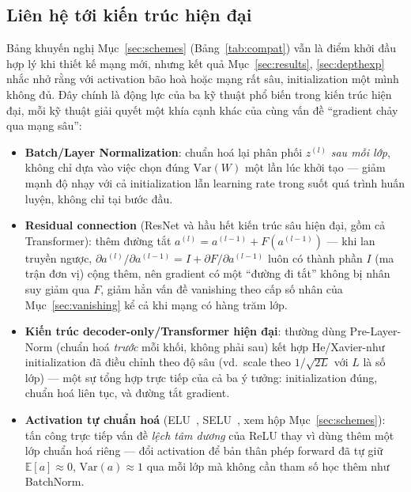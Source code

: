 \documentclass[12pt,a4paper]{article}
\begin{document}
\subsection{Liên hệ tới kiến trúc hiện đại}

Bảng khuyến nghị Mục~\ref{sec:schemes} (Bảng~\ref{tab:compat}) vẫn là
điểm khởi đầu hợp lý khi thiết kế mạng mới, nhưng kết quả
Mục~\ref{sec:results}, \ref{sec:depthexp} nhắc nhở rằng với activation
bão hoà hoặc mạng rất sâu, initialization một mình không đủ. Đây chính là
động lực của ba kỹ thuật phổ biến trong kiến trúc hiện đại, mỗi kỹ thuật
giải quyết một khía cạnh khác của cùng vấn đề ``gradient chảy qua mạng
sâu'':

\begin{itemize}
\item \textbf{Batch/Layer Normalization}: chuẩn hoá lại phân phối
  $z^{(l)}$ \emph{sau mỗi lớp}, không chỉ dựa vào việc chọn đúng
  $\mathrm{Var}(W)$ một lần lúc khởi tạo --- giảm mạnh độ nhạy với cả
  initialization lẫn learning rate trong suốt quá trình huấn luyện, không
  chỉ tại bước đầu.
\item \textbf{Residual connection} (ResNet và hầu hết kiến trúc sâu hiện
  đại, gồm cả Transformer): thêm đường tắt $a^{(l)}=a^{(l-1)}+F(a^{(l-1)})$
  --- khi lan truyền ngược, $\partial a^{(l)}/\partial a^{(l-1)} = I + \partial F/\partial a^{(l-1)}$
  luôn có thành phần $I$ (ma trận đơn vị) cộng thêm, nên gradient có một
  ``đường đi tắt'' không bị nhân suy giảm qua $F$, giảm hẳn vấn đề vanishing
  theo cấp số nhân của Mục~\ref{sec:vanishing} kể cả khi mạng có hàng trăm
  lớp.
\item \textbf{Kiến trúc decoder-only/Transformer hiện đại}: thường dùng
  Pre-Layer-Norm (chuẩn hoá \emph{trước} mỗi khối, không phải sau) kết
  hợp He/Xavier-như initialization đã điều chỉnh theo độ sâu (vd.\ scale
  theo $1/\sqrt{2L}$ với $L$ là số lớp) --- một sự tổng hợp trực tiếp của
  cả ba ý tưởng: initialization đúng, chuẩn hoá liên tục, và đường tắt
  gradient.
\item \textbf{Activation tự chuẩn hoá} (ELU~\citep{clevert2016elu},
  SELU~\citep{klambauer2017selu}, xem hộp Mục~\ref{sec:schemes}): tấn
  công trực tiếp vấn đề \emph{lệch tâm dương} của ReLU thay vì dùng thêm
  một lớp chuẩn hoá riêng --- đổi activation để bản thân phép forward đã
  tự giữ $\mathbb E[a]\approx0$, $\mathrm{Var}(a)\approx1$ qua mỗi lớp mà
  không cần tham số học thêm như BatchNorm.
\end{itemize}
\end{document}
